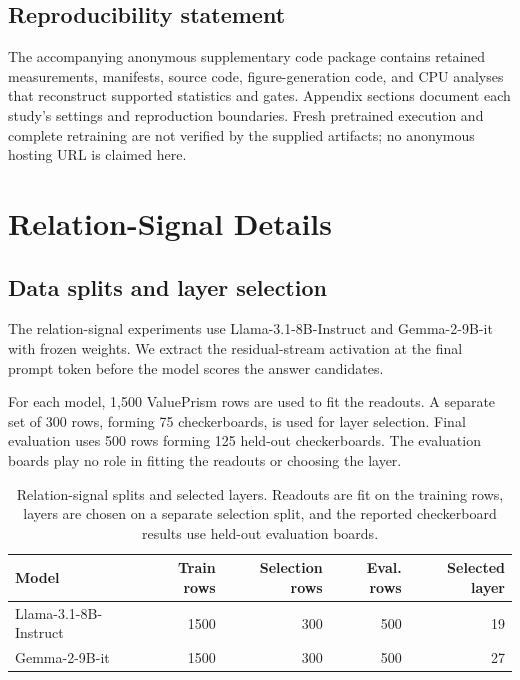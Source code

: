 \documentclass{article}
\begin{document}
\subsection*{Reproducibility statement}
The accompanying anonymous supplementary code package contains retained measurements, manifests, source code, figure-generation code, and CPU analyses that reconstruct supported statistics and gates. Appendix sections document each study's settings and reproduction boundaries. Fresh pretrained execution and complete retraining are not verified by the supplied artifacts; no anonymous hosting URL is claimed here.




\appendix


\section{Relation-Signal Details}
\label{app:relation-signal}

\subsection{Data splits and layer selection}

The relation-signal experiments use Llama-3.1-8B-Instruct and
Gemma-2-9B-it with frozen weights. We extract the residual-stream activation
at the final prompt token before the model scores the answer candidates.

For each model, 1,500 ValuePrism rows are used to fit the readouts.
A separate set of 300 rows, forming 75 checkerboards, is used for layer
selection. Final evaluation uses 500 rows forming 125 held-out checkerboards.
The evaluation boards play no role in fitting the readouts or choosing the
layer.

\begin{table}[htbp]
\caption{Relation-signal splits and selected layers.
Readouts are fit on the training rows, layers are chosen on a separate
selection split, and the reported checkerboard results use held-out evaluation
boards.}
\label{tab:relation-splits}

\centering
\small
\begin{tabular}{lrrrr}
\toprule
Model & Train rows & Selection rows & Eval. rows & Selected layer \\
\midrule
Llama-3.1-8B-Instruct & 1500 & 300 & 500 & 19 \\
Gemma-2-9B-it & 1500 & 300 & 500 & 27 \\
\bottomrule
\end{tabular}


\end{table}
\end{document}

